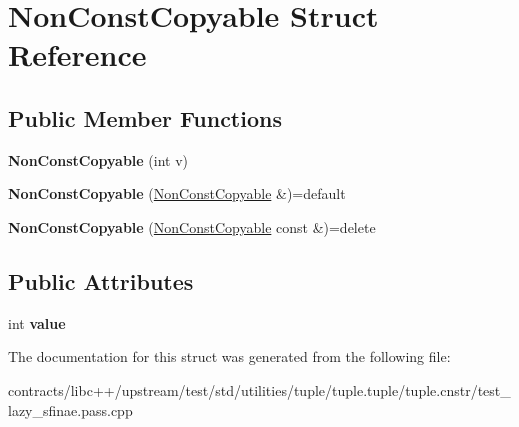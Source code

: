 \hypertarget{struct_non_const_copyable}{}\section{Non\+Const\+Copyable Struct Reference}
\label{struct_non_const_copyable}
\subsection*{Public Member Functions}
\begin{DoxyCompactItemize}
\item 
\mbox{\label{struct_non_const_copyable_a1816cd85cb0be392012cb6cbf43616f6}} 
{\bfseries Non\+Const\+Copyable} (int v)
\item 
\mbox{\label{struct_non_const_copyable_aa56bd2e77e07fcd65ed716738abf6acb}} 
{\bfseries Non\+Const\+Copyable} (\mbox{\hyperlink{struct_non_const_copyable}{Non\+Const\+Copyable}} \&)=default
\item 
\mbox{\label{struct_non_const_copyable_a5f635058134518e81e2133001c2a731d}} 
{\bfseries Non\+Const\+Copyable} (\mbox{\hyperlink{struct_non_const_copyable}{Non\+Const\+Copyable}} const \&)=delete
\end{DoxyCompactItemize}
\subsection*{Public Attributes}
\begin{DoxyCompactItemize}
\item 
\mbox{\label{struct_non_const_copyable_a2acfe6848e771986e8e314ebcca14627}} 
int {\bfseries value}
\end{DoxyCompactItemize}


The documentation for this struct was generated from the following file\+:\begin{DoxyCompactItemize}
\item 
contracts/libc++/upstream/test/std/utilities/tuple/tuple.\+tuple/tuple.\+cnstr/test\+\_\+lazy\+\_\+sfinae.\+pass.\+cpp\end{DoxyCompactItemize}
